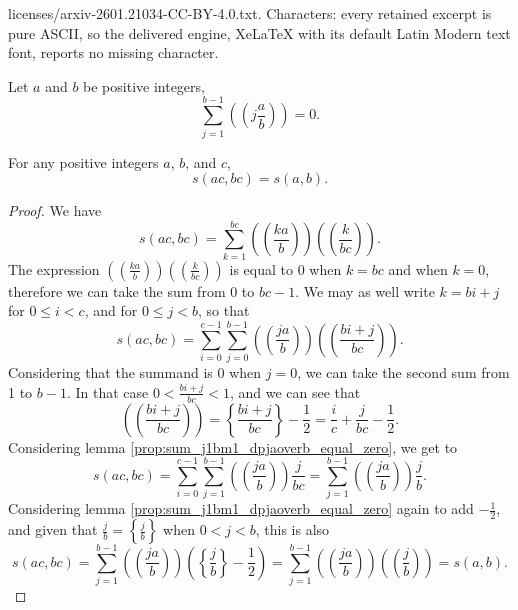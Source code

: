 \documentclass[10pt,a4paper]{amsart}
\newcommand{\doublepariii}[1]{\left(\!\!\!\left(#1\right)\!\!\!\right)}
\newcommand{\doubleparii}[1]{\left(\!\!\left(#1\right)\!\!\right)}
\begin{document}
licenses/arxiv-2601.21034-CC-BY-4.0.txt. Characters: every retained excerpt is pure ASCII, so the delivered engine, XeLaTeX with its default Latin Modern text font, reports no missing character.
\begin{proposition}\label{prop:sum_j1bm1_dpjaoverb_equal_zero} Let $a$ and $b$ be positive integers,
\begin{equation}
\sum_{j=1}^{b-1} \doubleparii{j\frac{a}{b}} = 0.
\end{equation}
\end{proposition}

\begin{proposition}\label{prop:sab_equals_sacbc} For any positive integers $a$, $b$, and $c$,
\begin{equation}
s(ac,bc)=s(a,b).
\end{equation}
\end{proposition}

\begin{proof} We have
\begin{equation*}
s(ac,bc) = \sum_{k=1}^{bc} \doublepariii{\frac{ka}{b}}\doublepariii{\frac{k}{bc}}.
\end{equation*}
The expression $\doubleparii{\frac{ka}{b}}\doubleparii{\frac{k}{bc}}$ is equal to 0 when $k=bc$ and when $k=0$, therefore we can take the sum from 0 to $bc-1$. We may as well write $k=bi+j$ for $0\leq i<c$, and for $0\leq j<b$, so that
\begin{equation*}
s(ac,bc) = \sum_{i=0}^{c-1}\sum_{j=0}^{b-1} \doublepariii{\frac{ja}{b}}\doublepariii{\frac{bi+j}{bc}}.
\end{equation*}
Considering that the summand is 0 when $j=0$, we can take the second sum from 1 to $b-1$. In that case $0<\frac{bi+j}{bc}<1$, and we can see that
\begin{equation*}
\doublepariii{\frac{bi+j}{bc}} = \left\{\frac{bi+j}{bc}\right\}-\frac{1}{2} = \frac{i}{c}+\frac{j}{bc}-\frac{1}{2}.
\end{equation*}
Considering lemma \ref{prop:sum_j1bm1_dpjaoverb_equal_zero}, we get to
\begin{equation*}
s(ac,bc) = \sum_{i=0}^{c-1}\sum_{j=1}^{b-1} \doublepariii{\frac{ja}{b}}\frac{j}{bc} = \sum_{j=1}^{b-1} \doublepariii{\frac{ja}{b}}\frac{j}{b}.
\end{equation*}
Considering lemma \ref{prop:sum_j1bm1_dpjaoverb_equal_zero} again to add $-\frac{1}{2}$, and given that $\frac{j}{b}=\left\{\frac{j}{b}\right\}$ when $0<j<b$, this is also
\begin{equation*}
s(ac,bc) = \sum_{j=1}^{b-1} \doublepariii{\frac{ja}{b}}\left(\left\{\frac{j}{b}\right\}-\frac{1}{2}\right) = \sum_{j=1}^{b-1} \doublepariii{\frac{ja}{b}}\doublepariii{\frac{j}{b}} = s(a,b).
\end{equation*}
\end{proof}
\end{document}
